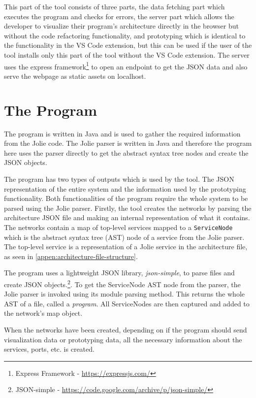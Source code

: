 This part of the tool consists of three parts, the data fetching part which executes the \javatoolname[] program and checks for errors, the server part which allows the developer to visualize their program's architecture directly in the browser but without the code refactoring functionality, and
prototyping which is identical to the functionality in the VS Code extension, but this can be used if the user of the tool installs only this part of the tool without the VS Code extension.
The server uses the express framework\footnote{Express Framework - \url{https://expressjs.com/}} to open an endpoint to get the JSON data and also serve the webpage as static assets on localhost.

\section{The \javatoolname[] Program}
The \javatoolname[] program is written in Java and is used to gather the required information from the Jolie code. The Jolie parser is written in Java and therefore the \javatoolname[] program here uses the parser directly to get the abstract syntax tree nodes and create the JSON objects.

The \javatoolname[] program has two types of outputs which is used by the tool. The JSON representation of the entire system and the information used by the prototyping functionality. Both functionalities of the \javatoolname[] program require the whole system to be parsed using the Jolie parser.
Firstly, the tool creates the networks by parsing the architecture JSON file and making an internal representation of what it contains. The networks contain a map of top-level services mapped to a \texttt{ServiceNode} which is the abstract syntax tree (AST) node of a service from the Jolie parser. The top-level service is a representation of a Jolie service in the architecture file, as seen in \cref{appen:architecture-file-structure}.

The \javatoolname[] program uses a lightweight JSON library, \emph{json-simple}, to parse files and create JSON objects.\footnote{JSON-simple - \url{https://code.google.com/archive/p/json-simple/}}.
To get the ServiceNode AST node from the parser, the Jolie parser is invoked using its module parsing method. This returns the whole AST of a file, called a \emph{program}. All ServiceNodes are then captured and added to the network's map object.

When the networks have been created, depending on if the program should send visualization data or prototyping data, all the necessary information about the services, ports, etc. is created.

